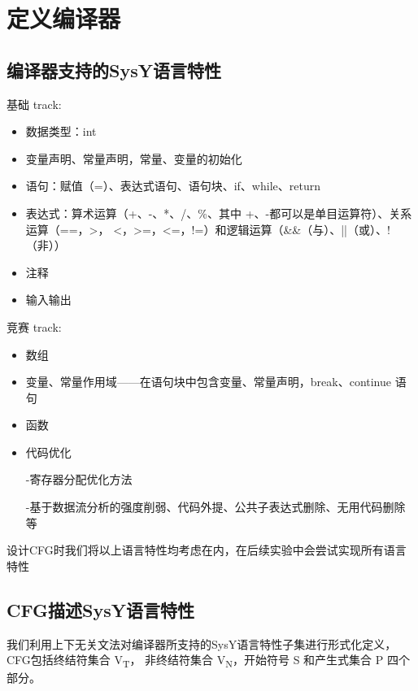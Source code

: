 \documentclass[UTF8,a4paper,10pt]{ctexart}
\begin{document}
\section{定义编译器}
\subsection{编译器支持的SysY语言特性}

\noindent 基础 track:
\begin{itemize}
\item 数据类型：int
\item 变量声明、常量声明，常量、变量的初始化
\item 语句：赋值（=）、表达式语句、语句块、if、while、return
\item 表达式：算术运算（+、-、*、/、\%、其中 +、-都可以是单目运算符）、关系运算（==，>，
<，>=，<=，!=）和逻辑运算（\&\&（与）、||（或）、!（非））
\item 注释
\item 输入输出
\end{itemize}

\noindent 竞赛 track:
\begin{itemize}
\item 数组
\item 变量、常量作用域——在语句块中包含变量、常量声明，break、continue 语句
\item 函数
\item 代码优化\par
\noindent\hspace{1em}-寄存器分配优化方法\par
\noindent\hspace{1em}-基于数据流分析的强度削弱、代码外提、公共子表达式删除、无用代码删除等\par
\end{itemize}
设计CFG时我们将以上语言特性均考虑在内，在后续实验中会尝试实现所有语言特性

\subsection{CFG描述SysY语言特性}
我们利用上下无关文法对编译器所支持的SysY语言特性子集进行形式化定义，CFG包括终结符集合 V\textsubscript{T}，
非终结符集合 V\textsubscript{N}，开始符号 S 和产生式集合 P 四个部分。
\end{document}
